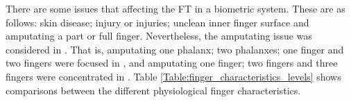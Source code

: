 \documentclass[review]{elsarticle}
\begin{document}
	There are some issues that affecting the FT in a biometric system. These are as follows: skin disease; injury or injuries; unclean inner finger surface and amputating a part or full finger. Nevertheless, the amputating issue was considered in \cite{Al-Nima2017Robust,Al-Nima2017finger}. That is, amputating one phalanx; two phalanxes; one finger and two fingers were focused in \cite{Al-Nima2017Robust}, and amputating one finger; two fingers and three fingers were concentrated in \cite{Al-Nima2017finger}. Table \ref{Table:finger_characteristics_levels} shows comparisons between the different physiological finger characteristics.
\end{document}
